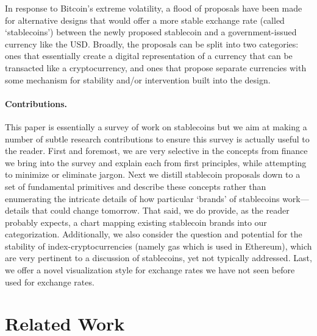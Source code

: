 In response to Bitcoin's extreme volatility, a flood of proposals have been made for alternative designs that would offer a more stable exchange rate (called `stablecoins') between the newly proposed stablecoin and a government-issued currency like the USD. Broadly, the proposals can be split into two categories: ones that essentially create a digital representation of a currency that can be transacted like a cryptocurrency, and ones that propose separate currencies with some mechanism for stability and/or intervention built into the design.

\paragraph{Contributions.} This paper is essentially a survey of work on stablecoins but we aim at making a number of subtle research contributions to ensure this survey is actually useful to the reader. First and foremost, we are very selective in the concepts from finance we bring into the survey and explain each from first principles, while attempting to minimize or eliminate jargon. Next we distill stablecoin proposals down to a set of fundamental primitives and describe these concepts rather than enumerating the intricate details of how particular `brands' of stablecoins work---details that could change tomorrow. That said, we do provide, as the reader probably expects, a chart mapping existing stablecoin brands into our categorization. Additionally, we also consider the question and potential for the stability of  index-cryptocurrencies (namely gas which is used in Ethereum), which are very pertinent to a discussion of stablecoins, yet not typically addressed. Last, we offer a novel visualization style for exchange rates we have not seen before used for exchange rates.




\section{Related Work}
\label{sec:lit}

